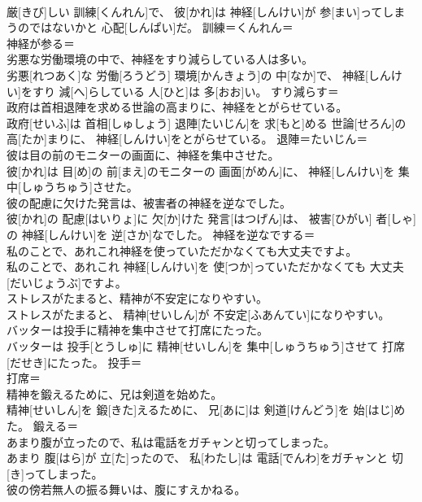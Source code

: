 \documentclass[8pt]{extreport}
\begin{document}
\begin{CJK}{UTF8}{min}
\\	厳[きび]しい 訓練[くんれん]で、 彼[かれ]は 神経[しんけい]が 参[まい]ってしまうのではないかと 心配[しんぱい]だ。	訓練＝くんれん＝ 
\\	神経が参る＝ 
\\	劣悪な労働環境の中で、神経をすり減らしている人は多い。	
\\	劣悪[れつあく]な 労働[ろうどう] 環境[かんきょう]の 中[なか]で、 神経[しんけい]をすり 減[へ]らしている 人[ひと]は 多[おお]い。	すり減らす＝ 
\\	政府は首相退陣を求める世論の高まりに、神経をとがらせている。	
\\	政府[せいふ]は 首相[しゅしょう] 退陣[たいじん]を 求[もと]める 世論[せろん]の 高[たか]まりに、 神経[しんけい]をとがらせている。	退陣＝たいじん＝ 
\\	彼は目の前のモニターの画面に、神経を集中させた。	
\\	彼[かれ]は 目[め]の 前[まえ]のモニターの 画面[がめん]に、 神経[しんけい]を 集中[しゅうちゅう]させた。	
\\	彼の配慮に欠けた発言は、被害者の神経を逆なでした。	
\\	彼[かれ]の 配慮[はいりょ]に 欠[か]けた 発言[はつげん]は、 被害[ひがい] 者[しゃ]の 神経[しんけい]を 逆[さか]なでした。	神経を逆なでする＝ 
\\	私のことで、あれこれ神経を使っていただかなくても大丈夫ですよ。	
\\	私のことで、あれこれ 神経[しんけい]を 使[つか]っていただかなくても 大丈夫[だいじょうぶ]ですよ。	
\\	ストレスがたまると、精神が不安定になりやすい。	
\\	ストレスがたまると、 精神[せいしん]が 不安定[ふあんてい]になりやすい。	
\\	バッターは投手に精神を集中させて打席にたった。	
\\	バッターは 投手[とうしゅ]に 精神[せいしん]を 集中[しゅうちゅう]させて 打席[だせき]にたった。	投手＝ 
\\	打席＝ 
\\	精神を鍛えるために、兄は剣道を始めた。	
\\	精神[せいしん]を 鍛[きた]えるために、 兄[あに]は 剣道[けんどう]を 始[はじ]めた。	鍛える＝ 
\\	あまり腹が立ったので、私は電話をガチャンと切ってしまった。	
\\	あまり 腹[はら]が 立[た]ったので、 私[わたし]は 電話[でんわ]をガチャンと 切[き]ってしまった。	
\\	彼の傍若無人の振る舞いは、腹にすえかねる。	

\end{CJK}
\end{document}
